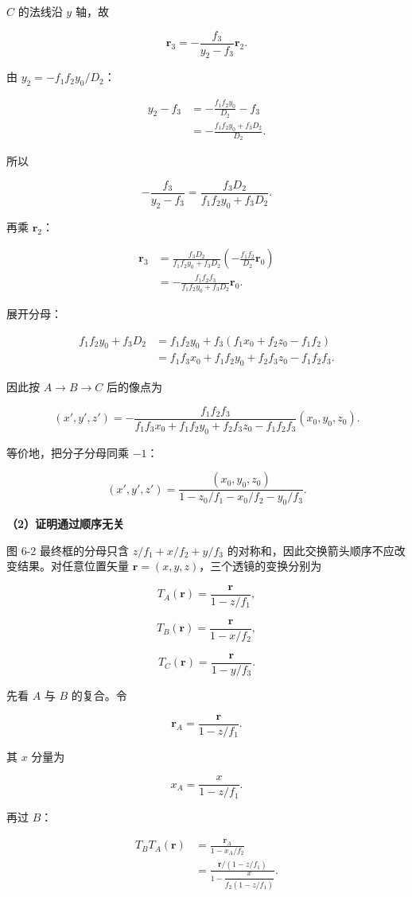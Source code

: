 \documentclass[12pt,a4paper,UTF8]{ctexart}
\begin{document}
\(C\) 的法线沿 \(y\) 轴，故

\[\bm r_3=-\frac{f_3}{y_2-f_3}\bm r_2.\]

由 \(y_2=-f_1f_2y_0/D_2\)：

\[\begin{aligned}
y_2-f_3
&=-\frac{f_1f_2y_0}{D_2}-f_3\\
&=-\frac{f_1f_2y_0+f_3D_2}{D_2}.
\end{aligned}\]

所以

\[-\frac{f_3}{y_2-f_3}
=\frac{f_3D_2}{f_1f_2y_0+f_3D_2}.\]

再乘 \(\bm r_2\)：

\[\begin{aligned}
\bm r_3
&=\frac{f_3D_2}{f_1f_2y_0+f_3D_2}
\left(-\frac{f_1f_2}{D_2}\bm r_0\right)\\
&=-\frac{f_1f_2f_3}{f_1f_2y_0+f_3D_2}\bm r_0.
\end{aligned}\]

展开分母：

\[\begin{aligned}
f_1f_2y_0+f_3D_2
&=f_1f_2y_0+f_3(f_1x_0+f_2z_0-f_1f_2)\\
&=f_1f_3x_0+f_1f_2y_0+f_2f_3z_0-f_1f_2f_3.
\end{aligned}\]

因此按 \(A\to B\to C\) 后的像点为

\[\boxed{
(x',y',z')
=-\frac{f_1f_2f_3}
{f_1f_3x_0+f_1f_2y_0+f_2f_3z_0-f_1f_2f_3}
(x_0,y_0,z_0)
}.\]

等价地，把分子分母同乘 \(-1\)：

\[\boxed{
(x',y',z')
=\frac{(x_0,y_0,z_0)}
{1-z_0/f_1-x_0/f_2-y_0/f_3}
}.\]

\textbf{（2）证明通过顺序无关}

图 6-2 最终框的分母只含 \(z/f_1+x/f_2+y/f_3\)
的对称和，因此交换箭头顺序不应改变结果。对任意位置矢量
\(\bm r=(x,y,z)\)，三个透镜的变换分别为

\[T_A(\bm r)=\frac{\bm r}{1-z/f_1},\]

\[T_B(\bm r)=\frac{\bm r}{1-x/f_2},\]

\[T_C(\bm r)=\frac{\bm r}{1-y/f_3}.\]

先看 \(A\) 与 \(B\) 的复合。令

\[\bm r_A=\frac{\bm r}{1-z/f_1}.\]

其 \(x\) 分量为

\[x_A=\frac{x}{1-z/f_1}.\]

再过 \(B\)：

\[\begin{aligned}
T_BT_A(\bm r)
&=\frac{\bm r_A}{1-x_A/f_2}\\
&=\frac{\bm r/(1-z/f_1)}
{1-\dfrac{x}{f_2(1-z/f_1)}}.
\end{aligned}\]
\end{document}
